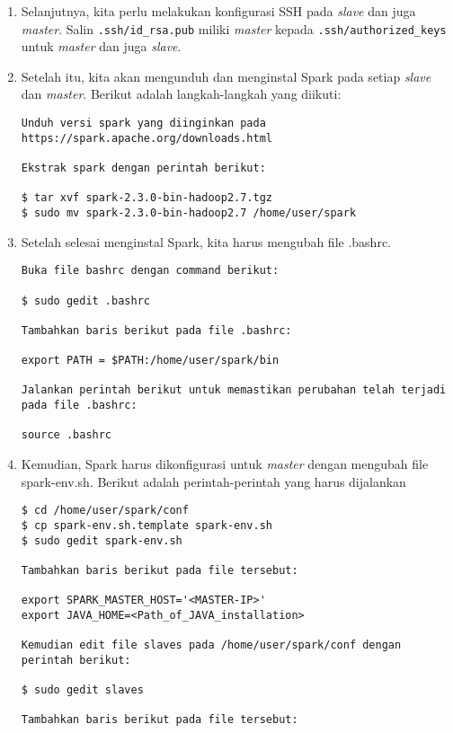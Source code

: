 \begin{enumerate}
\item Selanjutnya, kita perlu melakukan konfigurasi SSH pada \textit{slave} dan juga \textit{master}. Salin \texttt{.ssh/id\_rsa.pub} miliki \textit{master} kepada \texttt{.ssh/authorized\_keys} untuk \textit{master} dan juga \textit{slave}.

\item Setelah itu, kita akan mengunduh dan menginstal Spark pada setiap \textit{slave} dan \textit{master}. Berikut adalah langkah-langkah yang diikuti:

\begin{verbatim}
Unduh versi spark yang diinginkan pada https://spark.apache.org/downloads.html

Ekstrak spark dengan perintah berikut:

$ tar xvf spark-2.3.0-bin-hadoop2.7.tgz
$ sudo mv spark-2.3.0-bin-hadoop2.7 /home/user/spark
\end{verbatim}

\item Setelah selesai menginstal Spark, kita harus mengubah file .bashrc.

\begin{verbatim}
Buka file bashrc dengan command berikut:

$ sudo gedit .bashrc 

Tambahkan baris berikut pada file .bashrc:

export PATH = $PATH:/home/user/spark/bin

Jalankan perintah berikut untuk memastikan perubahan telah terjadi pada file .bashrc:

source .bashrc
\end{verbatim}

\item Kemudian, Spark harus dikonfigurasi untuk \textit{master} dengan mengubah file spark-env.sh. Berikut adalah perintah-perintah yang harus dijalankan

\begin{verbatim}
$ cd /home/user/spark/conf
$ cp spark-env.sh.template spark-env.sh
$ sudo gedit spark-env.sh

Tambahkan baris berikut pada file tersebut:

export SPARK_MASTER_HOST='<MASTER-IP>'
export JAVA_HOME=<Path_of_JAVA_installation>

Kemudian edit file slaves pada /home/user/spark/conf dengan perintah berikut:

$ sudo gedit slaves

Tambahkan baris berikut pada file tersebut:


\end{verbatim}
\end{enumerate}
